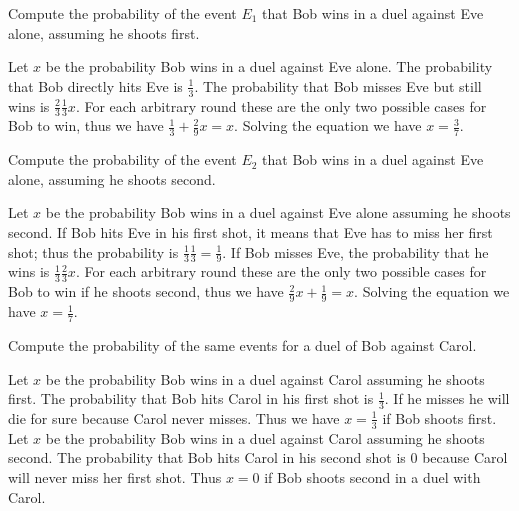 \documentclass[11pt]{article}
\begin{document}
\begin{Parts}
    
    \Part Compute the probability of the event $E_1$ that Bob wins in a duel against Eve alone, assuming he shoots first.
    \begin{Answer}
        Let $x$ be the probability Bob wins in a duel against Eve alone. The probability that Bob directly hits Eve is 
        $\frac{1}{3}$. The probability that Bob misses Eve but still wins is $\frac{2}{3}\frac{1}{3}x$. For each arbitrary 
        round these are the only two possible cases for Bob to win, thus we have $\frac{1}{3} + \frac{2}{9}x = x$. Solving 
        the equation we have $x = \frac{3}{7}$. 
    \end{Answer}

    \Part Compute the probability of the event $E_2$ that Bob wins in a duel against Eve alone, assuming he shoots second.
    \begin{Answer}
        Let $x$ be the probability Bob wins in a duel against Eve alone assuming he shoots second. If Bob hits Eve in his 
        first shot, it means that Eve has to miss her first shot; thus the probability is $\frac{1}{3}\frac{1}{3}=\frac{1}{9}$.
        If Bob misses Eve, the probability that he wins is $\frac{1}{3}\frac{2}{3}x$. For each arbitrary round these are 
        the only two possible cases for Bob to win if he shoots second, thus we have $\frac{2}{9}x + \frac{1}{9} = x$. 
        Solving the equation we have $x = \frac{1}{7}$. 
    \end{Answer}

    \Part Compute the probability of the same events for a duel of Bob against Carol.
    \begin{Answer}
        Let $x$ be the probability Bob wins in a duel against Carol assuming he shoots first. The probability that Bob 
        hits Carol in his first shot is $\frac{1}{3}$. If he misses he will die for sure because Carol never misses. 
        Thus we have $x = \frac{1}{3}$ if Bob shoots first. \\
        Let $x$ be the probability Bob wins in a duel against Carol assuming he shoots second. The probability that Bob 
        hits Carol in his second shot is $0$ because Carol will never miss her first shot. Thus $x = 0$ if Bob shoots 
        second in a duel with Carol. 
    \end{Answer}


\end{Parts}
\end{document}
